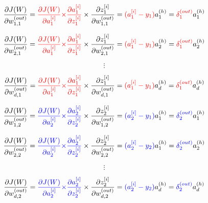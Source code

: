 \documentclass[12pt, letterpaper]{article}
\begin{document}
\[
    \frac{\partial J(W)}{\partial w_{1,1}^{(out)}} = 
    \textcolor{red}{\frac{\partial J(W)}{\partial a_{1}^{[i]}}\times}
    \textcolor{red}{\frac{\partial a_{1}^{[i]}}{\partial z_{1}^{[i]}}}\times
    \frac{\partial z_{1}^{[i]}}{\partial w_{1,1}^{(out)}} =
    \textcolor{red}{(a_{1}^{[i]} - y_1)} a_1^{(h)} =
    \textcolor{red}{\delta_1^{(out)}}a_1^{(h)}
\]

\[
    \frac{\partial J(W)}{\partial w_{2,1}^{(out)}} = 
    \textcolor{red}{\frac{\partial J(W)}{\partial a_{1}^{[i]}}\times}
    \textcolor{red}{\frac{\partial a_{1}^{[i]}}{\partial z_{1}^{[i]}}}\times
    \frac{\partial z_{1}^{[i]}}{\partial w_{2,1}^{(out)}} =
    \textcolor{red}{(a_{1}^{[i]} - y_1)} a_2^{(h)} =
    \textcolor{red}{\delta_1^{(out)}}a_2^{(h)}
\]

\[\vdots\]

\[
    \frac{\partial J(W)}{\partial w_{d,1}^{(out)}} = 
    \textcolor{red}{\frac{\partial J(W)}{\partial a_{1}^{[i]}}\times}
    \textcolor{red}{\frac{\partial a_{1}^{[i]}}{\partial z_{1}^{[i]}}} \times
    \frac{\partial z_{1}^{[i]}}{\partial w_{d,1}^{(out)}}=
    \textcolor{red}{(a_{1}^{[i]} - y_1)} a_d^{(h)} =
    \textcolor{red}{\delta_1^{(out)}}a_d^{(h)}
\]

\pagebreak

\[
    \frac{\partial J(W)}{\partial w_{1,2}^{(out)}} = 
    \textcolor{blue}{\frac{\partial J(W)}{\partial a_{2}^{[i]}}\times}
    \textcolor{blue}{\frac{\partial a_{2}^{[i]}}{\partial z_{2}^{[i]}}}\times
    \frac{\partial z_{2}^{[i]}}{\partial w_{1,2}^{(out)}} =
    \textcolor{blue}{(a_{2}^{[i]} - y_1)}a_1^{(h)}=
    \textcolor{blue}{\delta_2^{(out)}}a_1^{(h)}
\]

\[
    \frac{\partial J(W)}{\partial w_{2,2}^{(out)}} = 
    \textcolor{blue}{\frac{\partial J(W)}{\partial a_{2}^{[i]}}\times}
    \textcolor{blue}{\frac{\partial a_{2}^{[i]}}{\partial z_{2}^{[i]}}}\times
    \frac{\partial z_{2}^{[i]}}{\partial w_{2,2}^{(out)}} =
    \textcolor{blue}{(a_{2}^{[i]} - y_2)}a_1^{(h)}=
    \textcolor{blue}{\delta_2^{(out)}}a_2^{(h)}
\]

\[\vdots\]

\[
    \frac{\partial J(W)}{\partial w_{d,2}^{(out)}} = 
    \textcolor{blue}{\frac{\partial J(W)}{\partial a_{2}^{[i]}}\times}
    \textcolor{blue}{\frac{\partial a_{2}^{[i]}}{\partial z_{2}^{[i]}}} \times
    \frac{\partial z_{2}^{[i]}}{\partial w_{d,2}^{(out)}} =
    \textcolor{blue}{(a_{2}^{[i]} - y_2)}a_d^{(h)}=
    \textcolor{blue}{\delta_2^{(out)}}a_d^{(h)}
\]
\end{document}
